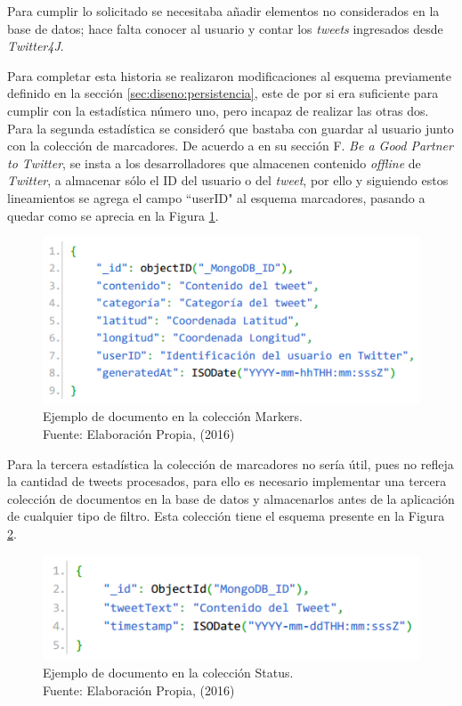Para cumplir lo solicitado se necesitaba añadir elementos no considerados en la base de datos; hace falta conocer al usuario y contar los \textit{tweets} ingresados desde \textit{Twitter4J}.

Para completar esta historia se realizaron modificaciones al esquema previamente definido en la sección \ref{sec:diseno:persistencia}, este de por si era suficiente para cumplir con la estadística número uno, pero incapaz de realizar las otras dos. Para la segunda estadística se consideró que bastaba con guardar al usuario junto con la colección de marcadores. De acuerdo a \cite{TwitterAgreement} en su sección F. \textit{Be a Good Partner to Twitter}, se insta a los desarrolladores que almacenen contenido \textit{offline} de \textit{Twitter}, a almacenar sólo el ID del usuario o del \textit{tweet}, por ello y siguiendo estos lineamientos se agrega el campo ``userID" al esquema marcadores, pasando a quedar como se aprecia en la Figura \ref{fig:esquemaMarker2}.

\begin{figure}[H]
	\centering
	\captionsetup{justification=centering}
	\includegraphics[scale=0.8]{images/Marker2.png}
	\caption[Ejemplo de documento en la colección Markers.]{Ejemplo de documento en la colección Markers.\\Fuente: Elaboración Propia, (2016)}
	\label{fig:esquemaMarker2}
\end{figure}

Para la tercera estadística la colección de marcadores no sería útil, pues no refleja la cantidad de tweets procesados, para ello es necesario implementar una tercera colección de documentos en la base de datos y almacenarlos antes de la aplicación de cualquier tipo de filtro. Esta colección tiene el esquema presente en la Figura \ref{fig:esquemaTweet}.

\begin{figure}[H]
	\centering
	\captionsetup{justification=centering}
	\includegraphics[scale=0.8]{images/status.png}
	\caption[Ejemplo de documento en la colección Status.]{Ejemplo de documento en la colección Status.\\Fuente: Elaboración Propia, (2016)}
	\label{fig:esquemaTweet}
\end{figure}

